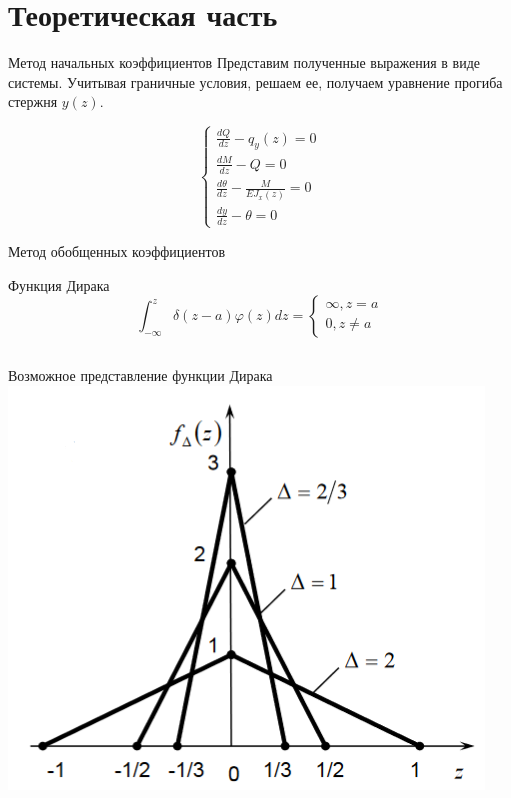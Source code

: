 \documentclass[ignoreonframetext,unicode]{beamer}
\begin{document}
\section{Теоретическая часть}

	\begin{frame}{Метод начальных коэффициентов}
		Представим полученные выражения в виде системы. Учитывая граничные условия, решаем ее, получаем уравнение прогиба стержня $y(z)$.
	
	\begin{block}{}	
		\[
		\begin{cases}
			\frac{d Q}{d z} - q_{y}(z) = 0\\
			\frac {d M}{d z} - Q = 0\\
			\frac{d \theta}{d z} - \frac{M}{E J_{x}(z)} = 0\\
			\frac{d y}{d z} - \theta = 0 
		\end{cases}
		\]
	\end{block}
	\end{frame}


	\begin{frame}{Метод обобщенных коэффициентов}
		\begin{block}{Функция Дирака}	
			\[
			\int_{-\infty}^z \delta (z - a) \varphi (z) dz = 
			\begin{cases}
				\infty, z = a \\
				0, z \neq a	
			\end{cases}
			\]
		\end{block}
		
		\begin{columns}
			Возможное представление функции Дирака
			\includegraphics[width=\textwidth]{dirac}
		\end{columns}
		
		
	\end{frame}
\end{document}

